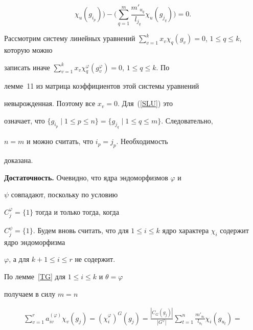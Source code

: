 \begin{pf}
\begin{equation}
\chi_{u}(g_{i_{p}})\bigg)-\bigg(\sum\limits^{m}_{q=1}


\frac{m'_{u_{q}}}{l_{j_{q}}} \chi_{u}(g_{j_{q}})\bigg)=0.


\end{equation}





Рассмотрим систему линейных уравнений $\sum\limits^{k}_{v=1}


x_{v}\chi_{q}(g_{v})=0$, $1\le q\le k$, которую можно


записать иначе $\sum\limits^{k}_{v=1}


x_{v}\chi^{\varphi}_{q}(g^{\varphi}_{v})=0$, $1\le q\le k$. По


лемме~11 из \cite{BelFomin} матрица коэффициентов этой системы уравнений


невырожденная. Поэтому все $x_{v}=0$. Для~(\ref{SLU}) это


означает, что $\{g_{i_{p}}\mid 1\le p\le


n\}=\{g_{j_{q}}\mid 1\le q\le m\}$. Следовательно,


$n=m$ и можно считать, что $i_{p}=j_{p}$. Необходимость


доказана.





{\bf Достаточность.} Очевидно, что ядра эндоморфизмов $\varphi$ и


$\psi$ совпадают, поскольку по условию


$C^{\varphi}_{j}=\{1\}$ тогда и только тогда, когда


$C^{\psi}_{j}=\{1\}$. Будем вновь считать, что для $1\le


i\le k$ ядро характера $\chi_{i}$ содержит ядро эндоморфизма


$\varphi$, а для $k+1\le i\le r$ не содержит.





По лемме~\ref{TG} для $1\le i\le k$ и $\theta=\varphi$


получаем в силу $m=n$


\begin{multline*}


\sum^{r}_{v=1} a^{(\varphi)}_{iv} \chi_{v}(g_{j})=


(\chi^{\varphi}_{i})^{G}(g_{j})= \frac{|C_{G}(g_{j})|}{|G^{\varphi}|}


\sum\limits^{n}_{t=1} \frac{m'_{u_{t}}}{l_{u_{t}}} \chi_{i}(g_{u_{t}})=\\



\end{multline*}
\end{pf}

